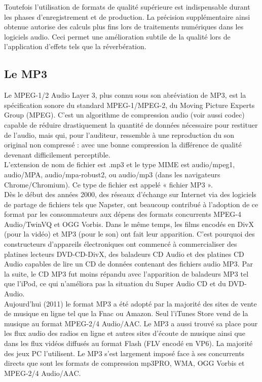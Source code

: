 \documentclass[12pt]{report}
\begin{document}
Toutefois l'utilisation de formats de qualité supérieure est indispensable durant les phases d'enregistrement et de production. La précision supplémentaire ainsi obtenue autorise des calculs plus fins lors de traitements numériques dans les logiciels audio. Ceci permet une amélioration subtile de la qualité lors de l'application d'effets tels que la réverbération.\\

\subsection{Le MP3}

Le MPEG-1/2 Audio Layer 3, plus connu sous son abréviation de MP3, est la spécification sonore du standard MPEG-1/MPEG-2, du Moving Picture Experts Group (MPEG). C'est un algorithme de compression audio (voir aussi codec) capable de réduire drastiquement la quantité de données nécessaire pour restituer de l'audio, mais qui, pour l'auditeur, ressemble à une reproduction du son original non compressé : avec une bonne compression la différence de qualité devenant difficilement perceptible.\\

L'extension de nom de fichier est .mp3 et le type MIME est audio/mpeg1, audio/MPA, audio/mpa-robust2, ou audio/mp3 (dans les navigateurs Chrome/Chromium). Ce type de fichier est appelé « fichier MP3 ».\\

Dès le début des années 2000, des réseaux d'échange sur Internet via des logiciels de partage de fichiers tels que Napster, ont beaucoup contribué à l'adoption de ce format par les consommateurs aux dépens des formats concurrents MPEG-4 Audio/TwinVQ et OGG Vorbis. Dans le même temps, les films encodés en DivX (pour la vidéo) et MP3 (pour le son) ont fait leur apparition. C'est pourquoi des constructeurs d'appareils électroniques ont commencé à commercialiser des platines lecteurs DVD-CD-DivX, des baladeurs CD Audio et des platines CD Audio capables de lire un CD de données contenant des fichiers audio MP3. Par la suite, le CD MP3 fut moins répandu avec l'apparition de baladeurs MP3 tel que l'iPod, ce qui n'améliora pas la situation du Super Audio CD et du DVD-Audio.\\

Aujourd'hui (2011) le format MP3 a été adopté par la majorité des sites de vente de musique en ligne tel que la Fnac ou Amazon. Seul l'iTunes Store vend de la musique au format MPEG-2/4 Audio/AAC. Le MP3 a aussi trouvé sa place pour les flux audio des radios en ligne et autres sites d'écoute de musique ainsi que dans les flux vidéos diffusés au format Flash (FLV encodé en VP6). La majorité des jeux PC l'utilisent. Le MP3 s'est largement imposé face à ses concurrents directs que sont les formats de compression mp3PRO, WMA, OGG Vorbis et MPEG-2/4 Audio/AAC.\\
\end{document}
